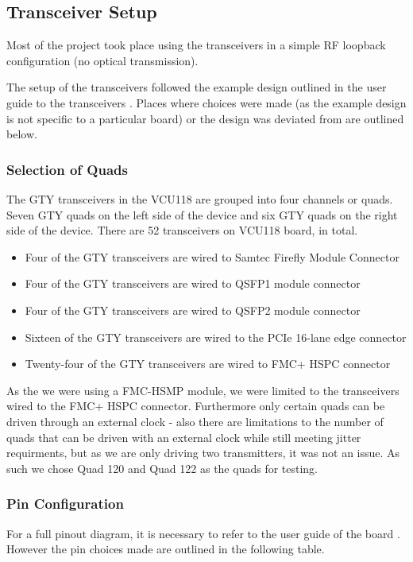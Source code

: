 \begin{figure}[ht]
\end{figure}

\subsection{Transceiver Setup}%
\label{sub:transceiver_setup}
Most of the project took place using the transceivers in a simple RF loopback
configuration (no optical transmission).

The setup of the transceivers followed the example design outlined in the user
guide to the transceivers \cite{wizard_guide}. Places where choices were made
(as the example design is not specific to a particular board) or the
design was deviated from are outlined below. 

\subsubsection{Selection of Quads}%
\label{ssub:selection_of_quads}
The GTY transceivers in the VCU118 are grouped into four channels or quads.
Seven GTY quads on the left side of the device and six GTY quads on the right
side of the device.
There are 52 transceivers on VCU118 board, in total.
\begin{itemize}
    \item Four of the GTY transceivers are wired to Samtec Firefly Module Connector 
    \item Four of the GTY transceivers are wired to QSFP1 module connector 
    \item Four of the GTY transceivers are wired to QSFP2 module connector 
    \item Sixteen of the GTY transceivers are wired to the PCIe 16-lane edge connector
    \item Twenty-four of the GTY transceivers are wired to FMC+ HSPC connector
\end{itemize}

As the we were using a FMC-HSMP module, we were limited to the transceivers wired
to the FMC+ HSPC connector.
Furthermore only certain quads can be driven through an external clock - also
there are limitations to the number of quads that can be driven with an
external clock while still meeting jitter requirments, but as we are only
driving two transmitters, it was not an issue.
As such we chose Quad 120 and Quad 122 as the quads for testing.

\subsubsection{Pin Configuration}%
\label{ssub:pin_configuration}
For a full pinout diagram, it is necessary to refer to the user guide of the
board \cite{vcu118_guide}. However the pin choices made are outlined in the
following table.


